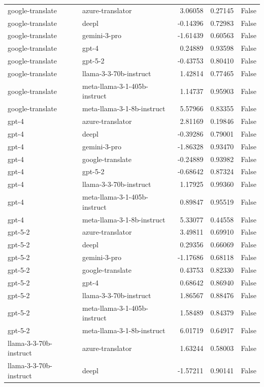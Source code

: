 \begin{tabular}{llrrr}
google-translate & azure-translator & 3.06058 & 0.27145 & False \\
google-translate & deepl & -0.14396 & 0.72983 & False \\
google-translate & gemini-3-pro & -1.61439 & 0.60563 & False \\
google-translate & gpt-4 & 0.24889 & 0.93598 & False \\
google-translate & gpt-5-2 & -0.43753 & 0.80410 & False \\
google-translate & llama-3-3-70b-instruct & 1.42814 & 0.77465 & False \\
google-translate & meta-llama-3-1-405b-instruct & 1.14737 & 0.95903 & False \\
google-translate & meta-llama-3-1-8b-instruct & 5.57966 & 0.83355 & False \\
gpt-4 & azure-translator & 2.81169 & 0.19846 & False \\
gpt-4 & deepl & -0.39286 & 0.79001 & False \\
gpt-4 & gemini-3-pro & -1.86328 & 0.93470 & False \\
gpt-4 & google-translate & -0.24889 & 0.93982 & False \\
gpt-4 & gpt-5-2 & -0.68642 & 0.87324 & False \\
gpt-4 & llama-3-3-70b-instruct & 1.17925 & 0.99360 & False \\
gpt-4 & meta-llama-3-1-405b-instruct & 0.89847 & 0.95519 & False \\
gpt-4 & meta-llama-3-1-8b-instruct & 5.33077 & 0.44558 & False \\
gpt-5-2 & azure-translator & 3.49811 & 0.69910 & False \\
gpt-5-2 & deepl & 0.29356 & 0.66069 & False \\
gpt-5-2 & gemini-3-pro & -1.17686 & 0.68118 & False \\
gpt-5-2 & google-translate & 0.43753 & 0.82330 & False \\
gpt-5-2 & gpt-4 & 0.68642 & 0.86940 & False \\
gpt-5-2 & llama-3-3-70b-instruct & 1.86567 & 0.88476 & False \\
gpt-5-2 & meta-llama-3-1-405b-instruct & 1.58489 & 0.84379 & False \\
gpt-5-2 & meta-llama-3-1-8b-instruct & 6.01719 & 0.64917 & False \\
llama-3-3-70b-instruct & azure-translator & 1.63244 & 0.58003 & False \\
llama-3-3-70b-instruct & deepl & -1.57211 & 0.90141 & False \\

\end{tabular}
